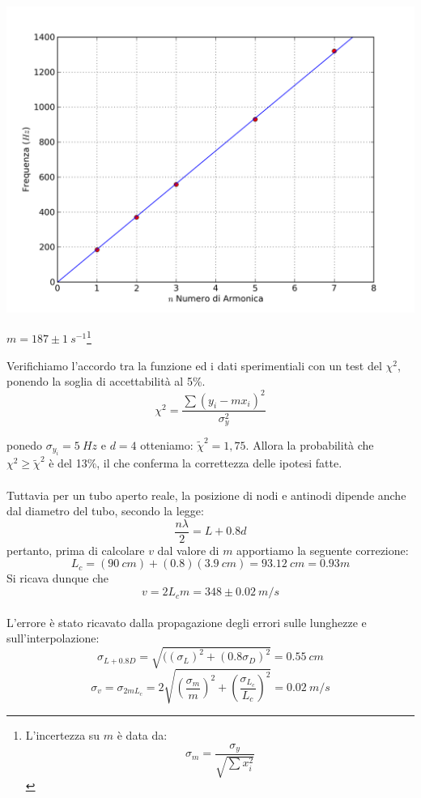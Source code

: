 \begin{center}

\includegraphics[scale=0.5]{../grafici/tubo/tubo1.png}

$m = 187\pm 1\ s^{-1}$\hspace{1cm}\footnote{L'incertezza su $m$ è data da: $$\sigma_m=\frac{\sigma_y}{\sqrt{\sum{x_i^2}}}$$}
\end{center}

Verifichiamo l'accordo tra la funzione ed i dati sperimentiali con un test del $\chi^2$, ponendo la soglia di accettabilità al 5\%.
\begin{equation}\label{chi2}
\chi^2=\displaystyle{\frac{\sum{(y_i-mx_i)^2}}{\sigma_{y}^2}}
\end{equation}

ponedo $\sigma_{y_i}=5\ Hz$ e $d=4$ otteniamo: $\tilde{\chi}^2=1,75$. Allora la probabilità che $\chi^2\geq\tilde{\chi}^2$ è del 13\%, il che conferma la correttezza delle ipotesi fatte.\\
\\
Tuttavia per un tubo aperto reale, la posizione di nodi e antinodi dipende anche dal diametro del tubo, secondo la legge:
$$\frac{n\lambda}{2}=L+0.8d$$ pertanto, prima di calcolare $v$ dal valore di $m$ apportiamo la seguente correzione:
$$ L_c = (90\ cm)+(0.8)(3.9\ cm) = 93.12\ cm = 0.93 m $$
Si ricava dunque che $$v=2L_cm=348\pm0.02\ m/s$$
\\
L'errore è stato ricavato dalla propagazione degli errori sulle lunghezze e sull'interpolazione:
$$\sigma_{L+0.8D}=\sqrt{((\sigma_L)^2+(0.8\sigma_D)^2}=0.55\ cm$$
$$\sigma_v= \sigma_{2mL_c}= 2\sqrt{\left(\frac{\sigma_m}{m}\right)^2+\left(\frac{\sigma_{L_{c}}}{L_c}\right)^2}= 0.02\ m/s$$


